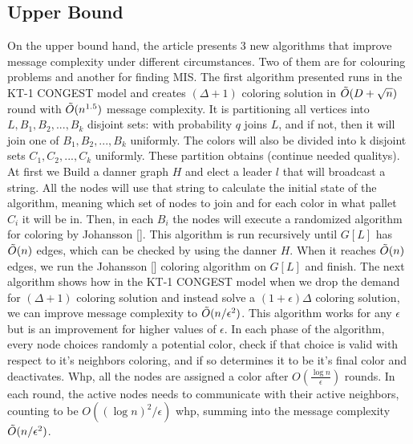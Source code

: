 \documentclass[11pt]{article}
\begin{document}
\subsection*{Upper Bound} On the upper bound hand, the article presents 3 new algorithms that improve message complexity under different circumstances. Two of them are for colouring problems and another for finding MIS.
\newline The first algorithm presented runs in the KT-1 CONGEST model and creates $(\Delta+1)$ coloring solution in ${\Tilde{O}}(D+\sqrt{n})$ round with ${\Tilde{O}}(n^{1.5})$ message complexity. It is partitioning all vertices into $L, B_1, B_2, ..., B_k$ disjoint sets: with probability $q$ joins $L$, and if not, then it will join one of $B_1, B_2, ..., B_k$ uniformly. The colors will also be divided into k disjoint sets $C_1, C_2, ..., C_k$ uniformly. These partition obtains (continue needed qualitys).
\newline At first we Build a danner graph $H$ and elect a leader $l$ that will broadcast a string. All the nodes will use that string to calculate the initial state of the algorithm, meaning which set of nodes to join and for each color in what pallet $C_i$ it will be in. Then, in each $B_i$ the nodes will execute a randomized algorithm for coloring by Johansson []. This algorithm is run recursively until $G[L]$ has $\Tilde{O}(n)$ edges, which can be checked by using the danner $H$. When it reaches $\Tilde{O}(n)$ edges, we run the Johansson [] coloring algorithm on $G[L]$ and finish.
\newline The next algorithm shows how in the KT-1 CONGEST model when we drop the demand for $(\Delta+1)$ coloring solution and instead solve a $(1+\epsilon)\Delta$ coloring solution, we can improve message complexity to $\Tilde{O}(n/\epsilon^2)$. This algorithm works for any $\epsilon$ but is an improvement for higher values of $\epsilon$.
In each phase of the algorithm, every node choices randomly a potential color, check if that choice is valid with respect to it's neighbors coloring, and if so determines it to be it's final color and deactivates. Whp, all the nodes are assigned a color after $O(\frac{\log{n}}{\epsilon})$ rounds. In each round, the active nodes needs to communicate with their active neighbors, counting to be $O((\log{n})^{2}/ \epsilon)$ whp, summing into the message complexity $\Tilde{O}(n/\epsilon^2)$.
\end{document}

